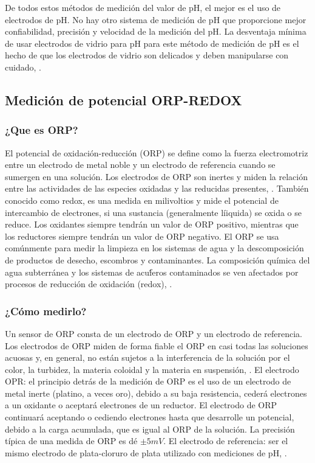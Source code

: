 De todos estos métodos de medición del valor de pH,  el mejor es el uso de electrodos de pH. 
No hay otro sistema de medición de pH que proporcione mejor confiabilidad, precisión y velocidad de la medición del pH. 
La desventaja mínima de usar electrodos de vidrio para pH para este m\'etodo de medici\'on de pH es el hecho de que los electrodos de vidrio son delicados y deben manipularse con cuidado, \cite{li_chapter_2019}.

\subsection{Medición de potencial ORP-REDOX}
\subsubsection{¿Que es ORP?}
El potencial de oxidaci\'on-reducci\'on (ORP) se define como la fuerza electromotriz entre un electrodo de metal noble y un electrodo de referencia cuando se sumergen en una soluci\'on.
Los electrodos de ORP son inertes y miden la relaci\'on entre las actividades de las especies oxidadas y las reducidas presentes, \cite{d19_committee_test_nodate}.
Tambi\'en conocido como redox, es una medida en milivoltios y mide el potencial de intercambio de electrones, si una sustancia (generalmente l\'iiquida) se oxida o se reduce. 
Los oxidantes siempre tendrán un valor de ORP positivo, mientras que los reductores siempre tendrán un valor de ORP negativo. 
El ORP se usa com\'unmente para medir la limpieza en los sistemas de agua y la descomposici\'on de productos de desecho, escombros y contaminantes. 
La composici\'on química del agua subterránea y los sistemas de acu\'feros contaminados se ven afectados por procesos de reducción de oxidación (redox), \cite{wator_redox_2020}.

\subsubsection{¿Cómo medirlo?}
Un sensor de ORP consta de un electrodo de ORP y un electrodo de referencia.
Los electrodos de ORP miden de forma fiable el ORP en casi todas las soluciones acuosas y, en general, no están sujetos a la interferencia de la solución por el color, la turbidez, la materia coloidal y la materia en suspensión, \cite{d19_committee_test_nodate}.
El electrodo OPR: el principio detr\'as de la medici\'on de ORP es el uso de un electrodo de metal inerte (platino, a veces oro), debido a su baja resistencia, ceder\'a electrones a un oxidante o aceptar\'a electrones de un reductor. 
El electrodo de ORP continuará aceptando o cediendo electrones hasta que desarrolle un potencial, debido a la carga acumulada, que es igual al ORP de la soluci\'on. 
La precisión t\'ipica de una medida de ORP es d\'e \( \pm5 mV\).
El electrodo de referencia:  ser el mismo electrodo de plata-cloruro de plata utilizado con mediciones de pH, \cite{li_chapter_2019}.

